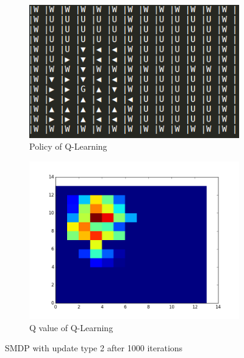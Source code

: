 \documentclass[]{article}
\begin{document}
\begin{figure}
	\centering
	\begin{subfigure}[b]{0.475\textwidth}
		\includegraphics[width=\linewidth]{update_2_policy.png}
		\caption{Policy of Q-Learning}
	\end{subfigure}
	\begin{subfigure}[b]{0.475\textwidth}
		\centering
		\includegraphics[width=.9\linewidth]{update_2_value_plot.png}
		\caption{Q value of Q-Learning}
	\end{subfigure}
	\caption{SMDP with update type 2 after 1000 iterations}
\end{figure}
\end{document}
